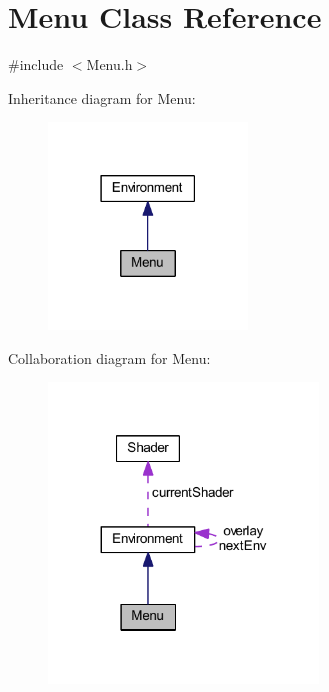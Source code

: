 \hypertarget{class_menu}{}\section{Menu Class Reference}
\label{class_menu}


{\ttfamily \#include $<$Menu.\+h$>$}



Inheritance diagram for Menu\+:
\nopagebreak
\begin{figure}[H]
\begin{center}
\leavevmode
\includegraphics[width=150pt]{class_menu__inherit__graph}
\end{center}
\end{figure}


Collaboration diagram for Menu\+:
\nopagebreak
\begin{figure}[H]
\begin{center}
\leavevmode
\includegraphics[width=203pt]{class_menu__coll__graph}
\end{center}
\end{figure}
